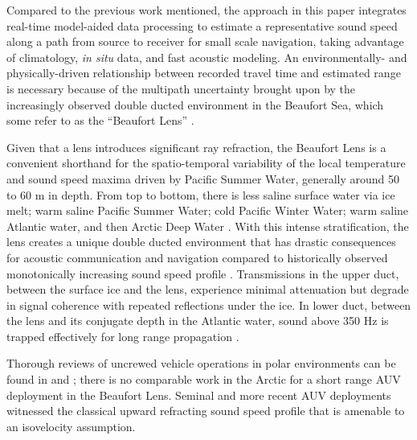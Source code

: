 Compared to the previous work mentioned, the approach in this paper integrates real-time model-aided data processing to estimate a representative sound speed along a path from source to receiver for small scale navigation, taking advantage of climatology, \textit{in situ} data, and fast acoustic modeling.
An environmentally- and physically-driven relationship between recorded travel time and estimated range is necessary because of the multipath uncertainty brought upon by the increasingly observed double ducted environment in the Beaufort Sea, which some refer to as the ``Beaufort Lens'' \citep{litvak2015acoustics,chen_spectral_2019,chen2020temporal}.

Given that a lens introduces significant ray refraction, the Beaufort Lens is a convenient shorthand for the spatio-temporal variability of the local temperature and sound speed maxima driven by Pacific Summer Water, generally around 50 to 60 m in depth.
From top to bottom, there is less saline surface water via ice melt; warm saline Pacific Summer Water; cold Pacific Winter Water; warm saline Atlantic water, and then Arctic Deep Water \citep{duda_acoustic_2017,ballard_temporal_2020}.
With this intense stratification, the lens creates a unique double ducted environment that has drastic consequences for acoustic communication and navigation compared to historically observed monotonically increasing sound speed profile \citep{schmidt2016acoustic}.
Transmissions in the upper duct, between the surface ice and the lens, experience minimal attenuation but degrade in signal coherence with repeated reflections under the ice.
In lower duct, between the lens and its conjugate depth in the Atlantic water, sound above 350 Hz is trapped effectively for long range propagation \citep{poulsen2016acoustic}.

Thorough reviews of uncrewed vehicle operations in polar environments can be found in \citep{norgren_unmanned_2014} and \citep{barker_scientific_2020}; there is no comparable work in the Arctic for a short range AUV deployment in the Beaufort Lens.
Seminal \citep{brooke1981arcs,jackson1983autonomous,light1989autonomous,bellingham1995auv,hayes2002determining} and more recent AUV deployments \citep{jakuba2008long,kunz_deep_2008,kukulya2010under,plueddemann_autonomous_2012,timmermans2013scales,fossum2021adaptive} witnessed the classical upward refracting sound speed profile that is amenable to an isovelocity assumption.

